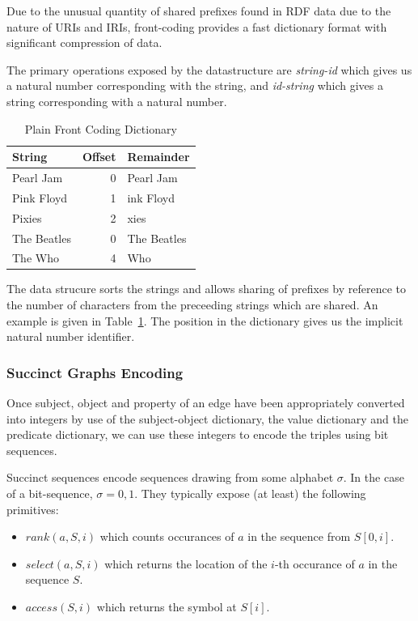 \documentclass[10pt, a4paper, twocolumn]{article} %
\begin{document}
Due to the unusual quantity of shared prefixes found in RDF data due
to the nature of URIs and IRIs, front-coding provides a fast
dictionary format with significant compression of
data\cite{MARTINEZPRIETO201673}.

The primary operations exposed by the datastructure are {\em
  string-id} which gives us a natural number corresponding with the
string, and {\em id-string} which gives a string corresponding with a
natural number.

\begin{table}
	\centering
	\begin{tabular}{l|rl}
		\toprule
		String & Offset & Remainder \\
		\midrule
        Pearl Jam & 0 & Pearl Jam \\
        Pink Floyd & 1 & ink Floyd \\
        Pixies & 2 & xies \\
		The Beatles & 0 & The Beatles \\
		The Who & 4 & Who \\
		\bottomrule
	\end{tabular}
    \caption{Plain Front Coding Dictionary}
    \label{tab:pfc}
\end{table}

The data strucure sorts the strings and allows sharing of prefixes by
reference to the number of characters from the preceeding strings
which are shared. An example is given in Table~\ref{tab:pfc}. The
position in the dictionary gives us the implicit natural number
identifier.

\subsubsection{Succinct Graphs Encoding}

Once subject, object and property of an edge have been appropriately
converted into integers by use of the subject-object dictionary, the
value dictionary and the predicate dictionary, we can use these
integers to encode the triples using bit sequences.

Succinct sequences encode sequences drawing from some alphabet
\(\sigma\). In the case of a bit-sequence, \(\sigma = {0,1}\). They
typically expose (at least) the following primitives:

\begin{itemize}
\item \(rank(a, S, i)\) which counts occurances of \(a\) in the sequence from \(S[0,i]\).
\item \(select(a, S, i)\) which returns the location of the \(i\)-th
  occurance of \(a\) in the sequence \(S\).
\item \(access(S, i)\) which returns the symbol at \(S[i]\).
\end{itemize}
\end{document}
